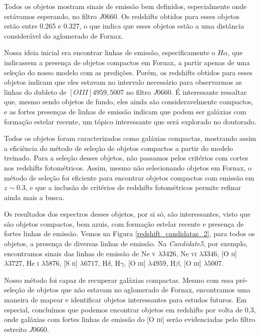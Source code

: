 Todos os objetos mostram sinais de emissão bem definidos, especialmente onde estávamos esperando, no filtro $J0660$. Os redshifts obtidos para esses objetos estão entre 0.265 e 0.327, o que indica que esses objetos estão a uma distância considerável do aglomerado de Fornax.

Nossa ideia inicial era encontrar linhas de emissão, especificamente o $H\alpha$, que indicassem a presença de objetos compactos em Fornax, a partir apenas de uma seleção do nosso modelo com as predições. Porém, os redshifts obtidos para esses objetos indicam que eles estavam no intervalo necessário para observarmos as linhas do dubleto de $[OIII]4959,5007$ no filtro $J0660$. É interessante ressaltar que, mesmo sendo objetos de fundo, eles ainda são consideravelmente compactos, e as fortes presenças de linhas de emissão indicam que podem ser galáxias com formação estelar recente, um tópico interessante que será explorado no doutorado.

Todos os objetos foram caracterizados como galáxias compactas, mostrando assim a eficiência do método de seleção de objetos compactos a partir do modelo treinado. Para a seleção desses objetos, não passamos pelos critérios com cortes nos redshifts fotométricos. Assim, mesmo não selecionando objetos em Fornax, o método de seleção foi eficiente para encontrar objetos compactos com emissão em $z\sim 0.3$, e que a inclusão de critérios de redshifts fotométricos permite refinar ainda mais a busca.

Os resultados dos espectros desses objetos, por si só, são interessantes, visto que são objetos compactos, bem azuis, com formação estelar recente e presença de fortes linhas de emissão. Vemos na Figura \ref{redshift_candidatas_2}, para todos os objetos, a presença de diversas linhas de emissão. Na \textit{Candidate5}, por exemplo, encontramos sinais das linhas de emissão de Ne \textsc{v} $\lambda3426$, Ne \textsc{vi} $\lambda3346$, [O \textsc{ii}] $\lambda3727$, He \textsc{i} $\lambda5876$, [S \textsc{ii}] $\lambda6717$, H$\delta$, H$\gamma$, [O \textsc{iii}] $\lambda4959$, H$\beta$, [O \textsc{iii}] $\lambda5007$.

Nosso método foi capaz de recuperar galáxias compactas. Mesmo com essa pré-seleção de objetos que não estavam no aglomerado de Fornax, encontramos uma maneira de mapear e identificar objetos interessantes para estudos futuros. Em especial, concluímos que podemos encontrar objetos em redshifts por volta de 0,3, onde galáxias com fortes linhas de emissão do [O \textsc{iii}] serão evidenciadas pelo filtro estreito $J0660$.

